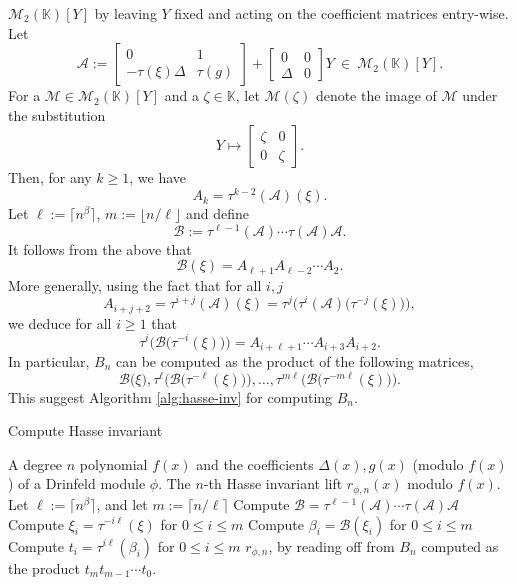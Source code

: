\documentclass[12pt]{article}
\theoremstyle{plain}
\theoremstyle{definition}
\def\K{\ensuremath{\mathbb{K}}}
\begin{document}
$\mathscr{M}_2(\K)[Y]$ by leaving $Y$ fixed and acting on the coefficient matrices entry-wise.
Let
\[
\mathcal{A} := 
\begin{bmatrix}
0 & 1 \\
-\tau(\xi)\Delta & \tau(g)
\end{bmatrix}
+
\begin{bmatrix}
0 & 0 \\
\Delta & 0
\end{bmatrix} Y ~ \in ~ \mathscr{M}_2(\K)[Y].
\]
For a $\mathcal{M} \in \mathscr{M}_2(\K)[Y]$ and a $\zeta \in \K$, let $\mathcal{M}(\zeta)$ denote 
the image of $\mathcal{M}$ under the substitution 
\[Y \longmapsto 
\begin{bmatrix}
\zeta & 0 \\
0 & \zeta
\end{bmatrix}.
\]
Then, for any $k \ge 1$, we have $$A_k = \tau^{k - 2}(\mathcal{A})(\xi).$$
Let $\ell := \lceil n^\beta \rceil$, $m := \lfloor n / \ell \rfloor$ and define 
\[\mathcal{B} := \tau^{\ell-1}(\mathcal{A}) \cdots \tau(\mathcal{A}) \mathcal{A}.\]
It follows from the above that 
\[\mathcal{B}(\xi) = A_{\ell+1}A_{\ell - 2} \cdots A_2.\]
More generally, using the fact that for all $i, j$
\[A_{i + j + 2} = \tau^{i + j}(\mathcal{A})(\xi) = \tau^j\Big(\tau^i(\mathcal{A})\big( 
\tau^{-j}(\xi)\big)\Big),\]
we deduce for all $i \ge 1$ that 
\[\tau^{i}\Big(\mathcal{B} \big( \tau^{-i}(\xi)\big) \Big) = A_{i + \ell+1} \cdots A_{i + 3}A_{i + 
	2}.\]
In particular, $B_n$ can be computed as the product of the following matrices, 
\[
\mathcal{B} \big(\xi\big), \tau^{\ell}\Big(\mathcal{B} \big( \tau^{-\ell}(\xi)\big) \Big), \dots, 
\tau^{m \ell}\Big(\mathcal{B} \big( \tau^{-m \ell}(\xi)\big) \Big).
\]
This suggest Algorithm \ref{alg:hasse-inv} for computing $B_n$.

\begin{algorithm}[H]
	\caption{Compute Hasse invariant}
	\label{alg:hasse-inv}
	\begin{algorithmic}[1]
		\REQUIRE A degree $n$ polynomial $f(x)$ and the coefficients $\Delta(x), g(x)$ (modulo 
		$f(x)$) of a Drinfeld module $\phi$.
		\ENSURE The $n$-th Hasse invariant lift $r_{\phi,n}(x)$ modulo $f(x)$.
		\STATE Let $\ell := \lceil n^\beta \rceil$, and let $m := \lceil n / \ell \rceil$
		\STATE\label{step:hasse-2}
		Compute $\mathcal{B} = \tau^{\ell-1}(\mathcal{A}) \cdots \tau(\mathcal{A}) \mathcal{A}$
		\STATE\label{step:hasse-3}
		Compute $\xi_i = \tau^{-i\ell}(\xi)$ for $0 \le i \le m$
		\STATE\label{step:hasse-4}
		Compute $\beta_i = \mathcal{B}(\xi_i)$ for $0 \le i \le m$
		\STATE\label{step:hasse-5}
		Compute $t_i = \tau^{i\ell}(\beta_i)$ for $0 \le i \le m$
		\RETURN\label{step:hasse-6} 
		$r_{\phi,n}$, by reading off from $B_n$ computed as the product $t_m t_{m - 1} \cdots t_0$.
	\end{algorithmic}
\end{algorithm}
\end{document}
